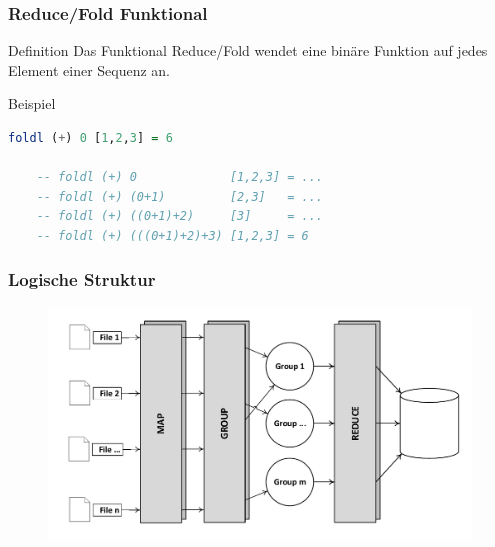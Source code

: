 \documentclass[presentation, shownotes]{beamer}
\begin{document}

\begin{frame}[fragile]
\frametitle{Reduce/Fold Funktional}
    \begin{block}{Definition}
        Das Funktional Reduce/Fold wendet eine binäre Funktion auf jedes Element einer Sequenz an.
    \end{block}

    \begin{block}{Beispiel}
    \begin{lstlisting}[language=haskell]
    foldl (+) 0 [1,2,3] = 6

    -- foldl (+) 0             [1,2,3] = ...
    -- foldl (+) (0+1)         [2,3]   = ...
    -- foldl (+) ((0+1)+2)     [3]     = ...
    -- foldl (+) (((0+1)+2)+3) [1,2,3] = 6
    \end{lstlisting}
    \end{block}
\end{frame}


\begin{frame}
\frametitle{Logische Struktur}
\begin{figure}
\centering
\includegraphics[height=.7\textheight]{mapred.pdf}
\end{figure}
\end{frame}


\end{document}
